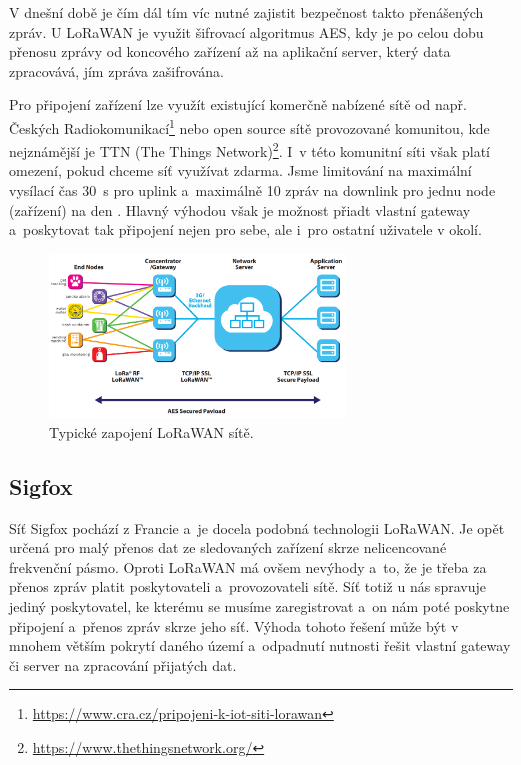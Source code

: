V dnešní době je čím dál tím víc nutné zajistit bezpečnost takto přenášených zpráv. U LoRaWAN je využit šifrovací algoritmus AES, kdy je po celou dobu přenosu zprávy od koncového zařízení až na aplikační server, který data zpracovává, jím zpráva zašifrována.

Pro připojení zařízení lze využít existující komerčně nabízené sítě od např. Českých Radiokomunikací\footnote{\url{https://www.cra.cz/pripojeni-k-iot-siti-lorawan}} nebo open source sítě provozované komunitou, kde nejznámější je TTN (The Things Network)\footnote{\url{https://www.thethingsnetwork.org/}}. I~v této komunitní síti však platí omezení, pokud chceme síť využívat zdarma. Jsme limitování na maximální vysílací čas \SI{30}{\second} pro uplink a~maximálně 10 zpráv na downlink pro jednu node (zařízení) na den \cite{TTN_fair_use}. Hlavný výhodou však je možnost přiadt vlastní gateway a~poskytovat tak připojení nejen pro sebe, ale i~pro ostatní uživatele v okolí.

\begin{figure}
    \centering
    \includegraphics[width=0.7\textwidth]{obrazky/lorawanNetwork.png}
    \caption{Typické zapojení LoRaWAN sítě. \cite{LoRaWAN_pdf}}
    \label{fig_LoRaWANNetwork}
\end{figure}

\subsection{Sigfox}

Síť Sigfox pochází z Francie a~je docela podobná technologii LoRaWAN. Je opět určená pro malý přenos dat ze sledovaných zařízení skrze nelicencované frekvenční pásmo. Oproti LoRaWAN má ovšem nevýhody a~to, že je třeba za přenos zpráv platit poskytovateli a~provozovateli sítě. Síť totiž u nás spravuje jediný poskytovatel, ke kterému se musíme zaregistrovat a~on nám poté poskytne připojení a~přenos zpráv skrze jeho síť. Výhoda tohoto řešení může být v mnohem větším pokrytí daného území a~odpadnutí nutnosti řešit vlastní gateway či server na zpracování přijatých dat.

